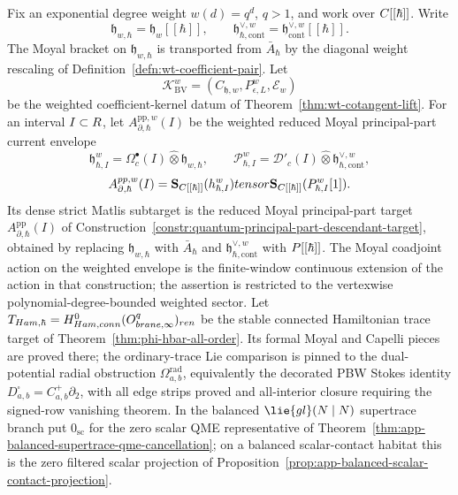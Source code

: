\documentclass[11pt]{memoir}
\begin{document}
\begin{thm}\label{thm:quantum-coefficient-surface}
  Fix an exponential degree weight \(w(d)=q^d\), \(q>1\), and work over
  \(C[[\hbar]]\).  Write
  \[
    \mathfrak h_{w,\hbar}=\mathfrak h_w[[\hbar]],\qquad
    \mathfrak h^{\vee,w}_{\hbar,\mathrm{cont}}
      =\mathfrak h^{\vee,w}_{\mathrm{cont}}[[\hbar]] .
  \]
  The Moyal bracket on \(\mathfrak h_{w,\hbar}\) is transported from
  \(\bar A_\hbar\) by the diagonal weight rescaling of
  Definition~\ref{defn:wt-coefficient-pair}.
  Let
  \[
    \mathcal K_{\mathrm{BV}}^w
      =(C_{\mathfrak h,w},P_{\epsilon,L}^w,\mathcal E_w)
  \]
  be the weighted coefficient-kernel datum of
  Theorem~\ref{thm:wt-cotangent-lift}.  For an interval \(I\subset R\), let
  \(A^{\mathrm{pp},w}_{\partial,\hbar}(I)\) be the weighted reduced
  Moyal principal-part current envelope
  \[
    \mathfrak h^w_{\hbar,I}
      =\Omega^\bullet_c(I)\widehat\otimes\mathfrak h_{w,\hbar},\qquad
    \mathcal P^w_{\hbar,I}
      =\mathcal D'_c(I)\widehat\otimes
        \mathfrak h^{\vee,w}_{\hbar,\mathrm{cont}},
  \]
  \[
    A^{pp,w}_{\partial,\hbar}(I)
      =
      \mathbf S_{C[[\hbar]]}(h^w_{\hbar,I})
      tensor
      \mathbf S_{C[[\hbar]]}(P^w_{\hbar,I}[1]).
  \]
  Its dense strict Matlis subtarget is the reduced Moyal
  principal-part target
  \(A^{\mathrm{pp}}_{\partial,\hbar}(I)\) of
  Construction~\ref{constr:quantum-principal-part-descendant-target},
  obtained by replacing
  \(\mathfrak h_{w,\hbar}\) with \(\bar A_\hbar\) and
  \(\mathfrak h^{\vee,w}_{\hbar,\mathrm{cont}}\) with
  \(P[[\hbar]]\).  The Moyal coadjoint action on the weighted envelope
  is the finite-window continuous extension of the action in that
  construction; the assertion is restricted to the vertexwise
  polynomial-degree-bounded weighted sector.
  Let
  \(T_{Ham,\hbar}=
  H^0_{Ham,conn}(O^{q}_{brane,\infty})_{ren}\)
  be the stable connected Hamiltonian trace target of
  Theorem~\ref{thm:phi-hbar-all-order}.  Its formal Moyal and Capelli
  pieces are proved there; the ordinary-trace Lie comparison is pinned
  to the dual-potential radial obstruction
  \(\Omega^{\mathrm{rad}}_{a,b}\), equivalently the decorated PBW Stokes
  identity \(D^\square_{a,b}=C^+_{a,b}\partial_2\), with all edge strips
  proved and all-interior closure requiring the signed-row vanishing
  theorem.  In the balanced
  \(\lie{gl}(N\mid N)\) supertrace branch put
  \(0_{\mathrm{sc}}\) for the zero scalar QME representative of
  Theorem~\ref{thm:app-balanced-supertrace-qme-cancellation}; on a
  balanced scalar-contact habitat this is the zero filtered scalar
  projection of
  Proposition~\ref{prop:app-balanced-scalar-contact-projection}.


\end{thm}
\end{document}
